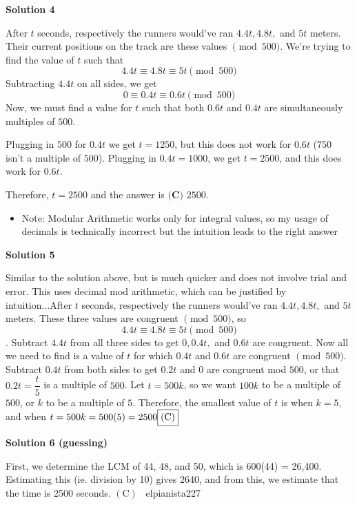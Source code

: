 \begin{enumerate}
\textbf{Solution 4}

After $t$ seconds, respectively the runners would've ran $4.4t, 4.8t,$ and $5t$ meters. Their current positions on the track are these values $\pmod{500}$. We're trying to find the value of $t$ such that 
 \[4.4t \equiv 4.8t \equiv 5t \pmod{500}\] Subtracting $4.4t$ on all sides, we get 
 \[0 \equiv 0.4t \equiv 0.6t \pmod{500}\] Now, we must find a value for $t$ such that both $0.6t$ and $0.4t$ are simultaneously multiples of $500$.

 Plugging in $500$ for $0.4t$ we get $t=1250$, but this does not work for $0.6t$ ($750$ isn't a multiple of $500$). Plugging in $0.4t=1000$, we get $t=2500$, and this does work for $0.6t$. 

 Therefore, $t=2500$ and the answer is $\boxed{\textbf{(C) } 2500}$.

 


 
            \begin{itemize}
        \item Note: Modular Arithmetic works only for integral values, so my usage of decimals is technically incorrect but the intuition leads to the right answer
            \end{itemize}
            



\textbf{Solution 5}

Similar to the solution above, but is much quicker and does not involve trial and error. This uses decimal mod arithmetic, which can be justified by intuition...After $t$ seconds, respectively the runners would've ran $4.4t, 4.8t,$ and $5t$ meters. These three values are congruent $\pmod{500}$, so 
 \[4.4t \equiv 4.8t \equiv 5t \pmod{500}\]. Subtract $4.4t$ from all three sides to get $0, 0.4t,$ and $0.6t$ are congruent. Now all we need to find is a value of $t$ for which $0.4t$ and $0.6t$ are congruent $\pmod{500}$. Subtract $0.4t$ from both sides to get $0.2t$ and $0$ are congruent mod $500$, or that $0.2t=\dfrac{t}{5}$ is a multiple of $500$. Let $t=500k$, so we want $100k$ to be a multiple of $500$, or $k$ to be a multiple of $5$. Therefore, the smallest value of $t$ is when $k=5$, and when $t=500k=500(5)=2500 \space \boxed{(\text{C})}$




\textbf{Solution 6 (guessing)}

First, we determine the LCM of 44, 48, and 50, which is 600(44) = 26,400. Estimating this (ie. division by 10) gives 2640, and from this, we estimate that the time is 2500 seconds. $\boxed{(\text{C})}$ ~elpianista227


\end{enumerate}
